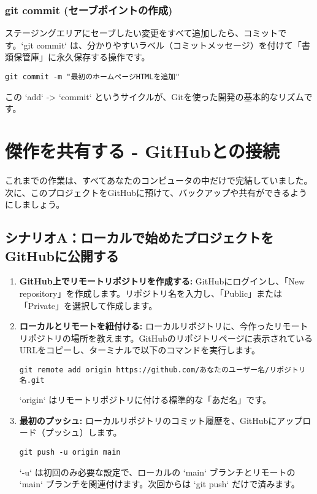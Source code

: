 \documentclass{ltjsarticle}
\begin{document}
\subsubsection{git commit (セーブポイントの作成)}
ステージングエリアにセーブしたい変更をすべて追加したら、コミットです。`git commit` は、分かりやすいラベル（コミットメッセージ）を付けて「書類保管庫」に永久保存する操作です。
\begin{verbatim}
git commit -m "最初のホームページHTMLを追加"
\end{verbatim}
この `add` -> `commit` というサイクルが、Gitを使った開発の基本的なリズムです。

\section{傑作を共有する - GitHubとの接続}
これまでの作業は、すべてあなたのコンピュータの中だけで完結していました。次に、このプロジェクトをGitHubに預けて、バックアップや共有ができるようにしましょう。

\subsection{シナリオA：ローカルで始めたプロジェクトをGitHubに公開する}
\begin{enumerate}
    \item \textbf{GitHub上でリモートリポジトリを作成する:} GitHubにログインし、「New repository」を作成します。リポジトリ名を入力し、「Public」または「Private」を選択して作成します。
    \item \textbf{ローカルとリモートを紐付ける:} ローカルリポジトリに、今作ったリモートリポジトリの場所を教えます。GitHubのリポジトリページに表示されているURLをコピーし、ターミナルで以下のコマンドを実行します。
    \begin{verbatim}
git remote add origin https://github.com/あなたのユーザー名/リポジトリ名.git
\end{verbatim}
    `origin` はリモートリポジトリに付ける標準的な「あだ名」です。
    \item \textbf{最初のプッシュ:} ローカルリポジトリのコミット履歴を、GitHubにアップロード（プッシュ）します。
    \begin{verbatim}
git push -u origin main
\end{verbatim}
    `-u` は初回のみ必要な設定で、ローカルの `main` ブランチとリモートの `main` ブランチを関連付けます。次回からは `git push` だけで済みます。
\end{enumerate}
\end{document}
